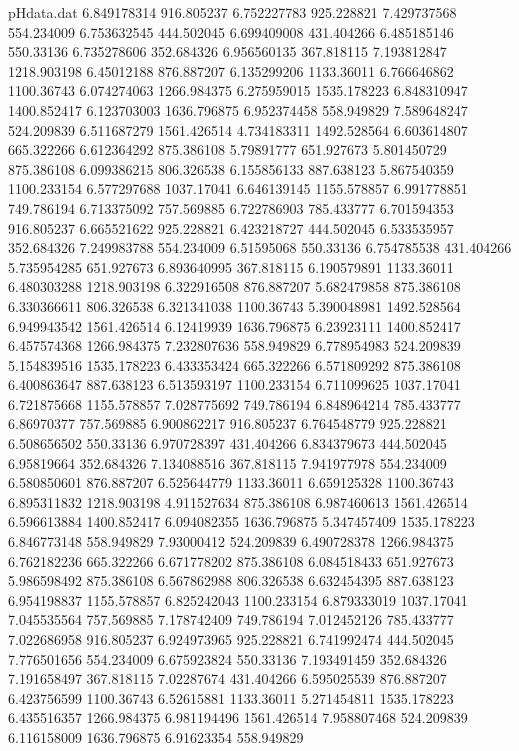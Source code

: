 \begin{filecontents}{pHdata.dat}
6.849178314	916.805237
6.752227783	925.228821
7.429737568	554.234009
6.753632545	444.502045
6.699409008	431.404266
6.485185146	550.33136
6.735278606	352.684326
6.956560135	367.818115
7.193812847	1218.903198
6.45012188	876.887207
6.135299206	1133.36011
6.766646862	1100.36743
6.074274063	1266.984375
6.275959015	1535.178223
6.848310947	1400.852417
6.123703003	1636.796875
6.952374458	558.949829
7.589648247	524.209839
6.511687279	1561.426514
4.734183311	1492.528564
6.603614807	665.322266
6.612364292	875.386108
5.79891777	651.927673
5.801450729	875.386108
6.099386215	806.326538
6.155856133	887.638123
5.867540359	1100.233154
6.577297688	1037.17041
6.646139145	1155.578857
6.991778851	749.786194
6.713375092	757.569885
6.722786903	785.433777
6.701594353	916.805237
6.665521622	925.228821
6.423218727	444.502045
6.533535957	352.684326
7.249983788	554.234009
6.51595068	550.33136
6.754785538	431.404266
5.735954285	651.927673
6.893640995	367.818115
6.190579891	1133.36011
6.480303288	1218.903198
6.322916508	876.887207
5.682479858	875.386108
6.330366611	806.326538
6.321341038	1100.36743
5.390048981	1492.528564
6.949943542	1561.426514
6.12419939	1636.796875
6.23923111	1400.852417
6.457574368	1266.984375
7.232807636	558.949829
6.778954983	524.209839
5.154839516	1535.178223
6.433353424	665.322266
6.571809292	875.386108
6.400863647	887.638123
6.513593197	1100.233154
6.711099625	1037.17041
6.721875668	1155.578857
7.028775692	749.786194
6.848964214	785.433777
6.86970377	757.569885
6.900862217	916.805237
6.764548779	925.228821
6.508656502	550.33136
6.970728397	431.404266
6.834379673	444.502045
6.95819664	352.684326
7.134088516	367.818115
7.941977978	554.234009
6.580850601	876.887207
6.525644779	1133.36011
6.659125328	1100.36743
6.895311832	1218.903198
4.911527634	875.386108
6.987460613	1561.426514
6.596613884	1400.852417
6.094082355	1636.796875
5.347457409	1535.178223
6.846773148	558.949829
7.93000412	524.209839
6.490728378	1266.984375
6.762182236	665.322266
6.671778202	875.386108
6.084518433	651.927673
5.986598492	875.386108
6.567862988	806.326538
6.632454395	887.638123
6.954198837	1155.578857
6.825242043	1100.233154
6.879333019	1037.17041
7.045535564	757.569885
7.178742409	749.786194
7.012452126	785.433777
7.022686958	916.805237
6.924973965	925.228821
6.741992474	444.502045
7.776501656	554.234009
6.675923824	550.33136
7.193491459	352.684326
7.191658497	367.818115
7.02287674	431.404266
6.595025539	876.887207
6.423756599	1100.36743
6.52615881	1133.36011
5.271454811	1535.178223
6.435516357	1266.984375
6.981194496	1561.426514
7.958807468	524.209839
6.116158009	1636.796875
6.91623354	558.949829

\end{filecontents}
